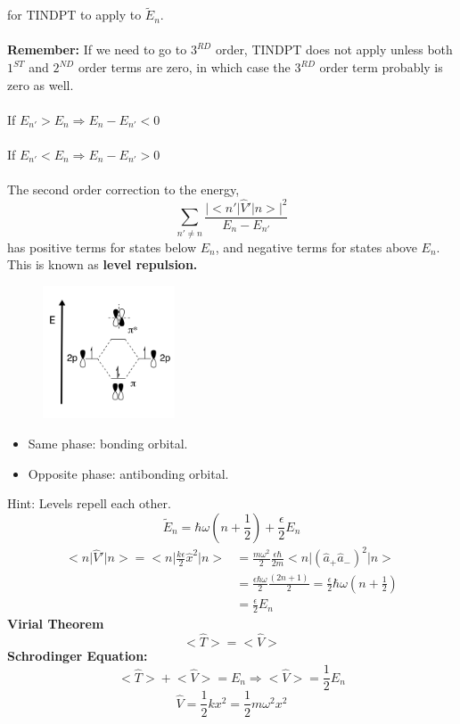 \documentclass[12pt,fancychapters]{report}
\numberwithin{equation}{section}
\begin{document}
for TINDPT to apply to $\tilde{E}_n$.\\
\\
\textbf{Remember:} If we need to go to $3^{RD}$ order, TINDPT does not apply unless both $1^{ST}$
and $2^{ND}$ order terms are zero, in which case the $3^{RD}$ order term probably is zero as well.\\
\\
If $E_{n'}>E_n \Longrightarrow E_n - E_{n'}<0$\\
\\
If $E_{n'}<E_n \Longrightarrow E_n - E_{n'}>0$\\
\\
The second order correction to the energy,
\begin{equation*}
	\sum_{n'\neq n}\frac{\big|\big<
	n'\big|\hat{V}'\big|n\big>\big|^2}{E_n - E_{n'}}
\end{equation*}
has positive terms for states below $E_n$, and negative terms for states above $E_n$. This is known
as \textbf{level repulsion.}
\begin{figure}[H]
  \centering
	\includegraphics[width=0.35\textwidth]{../Figures/repulsion.jpg}
\end{figure}
\begin{itemize}
	\item Same phase: bonding orbital.
	\item Opposite phase: antibonding orbital.
	\end{itemize}
Hint: Levels repell each other.
\begin{equation*}
	\tilde{E}_n = \hbar\omega\left(n+\frac{1}{2}\right)+\frac{\epsilon}{2}E_n
\end{equation*}
\begin{align*}
	\big<n\big|\hat{V}'\big|n\big> = \Bigg<n\Bigg|\frac{k\epsilon}{2}\hat{x}^2\Bigg|n\Bigg>
	& = \frac{m\omega^2}{2}\frac{\epsilon \hbar}{2m}\big<n\big|(\hat{a}_+\hat{a}_-)^2\big|n\big>\\
	& = \frac{\epsilon\hbar\omega}{2}\frac{(2n+1)}{2} = \frac{\epsilon}{2}\hbar\omega\left(n+\frac{1}{2}\right)\\
	& = \frac{\epsilon}{2}E_n
\end{align*}
\textbf{Virial Theorem}
\begin{equation*}
	\big<\hat{T}\big> = \big<\hat{V}\big>
\end{equation*}
\textbf{Schrodinger Equation:}
\begin{equation*}
	\big<\hat{T}\big>+\big<\hat{V}\big> = E_n \Longrightarrow \big<\hat{V}\big> = \frac{1}{2}E_n
\end{equation*}
\begin{equation*}
	\hat{V} = \frac{1}{2}kx^2 = \frac{1}{2}m\omega^2x^2
\end{equation*}
\end{document}
